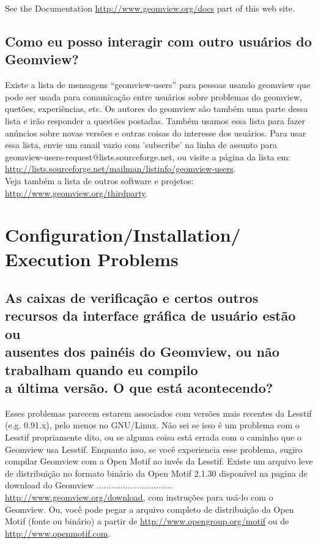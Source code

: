 \documentclass[12pt,a4paper]{article}
\begin{document}
        See the Documentation \url{http://www.geomview.org/docs} part of this web site.

    \subsection{Como eu posso interagir com outro usu\'arios do Geomview?}

        Existe a lista de mensagens ``geomview-users'' para pessoas usando geomview que
        pode ser usada para comunica\c{c}\~ao entre usu\'arios sobre problemas do geomview,
        quet\~oes, experi\^encias, etc. Os autores do geomview s\~ao tamb\'em uma parte dessa
        lista e ir\~ao responder a quest\~oes postadas. Tamb\'em usamos essa
        lista para fazer an\'uncios sobre novas vers\~oes e outras coisas do
        interesse dos usu\'arios. Para usar essa lista, envie um email vazio com 'subscribe'
        na linha de assunto para geomview-users-request@lists.sourceforge.net, ou visite a p\'agina
        da lista em:\\
        \url{http://lists.sourceforge.net/mailman/listinfo/geomview-users}.
	\\
        Veja tamb\'em a lista de outros software e projetos:\\
        \url{http://www.geomview.org/thirdparty}.

\section{Configuration/Installation/\\ Execution Problems}

    \subsection{As caixas de verifica\c{c}\~ao e certos outros recursos da interface gr\'afica de usu\'ario est\~ao ou \\
    ausentes dos pain\'eis do Geomview, ou n\~ao trabalham quando eu compilo \\
    a \'ultima vers\~ao. O que est\'a acontecendo?}

        Esses problemas parecem estarem associados com vers\~oes mais recentes da Lesstif
        (e.g. 0.91.x), pelo menos no GNU/Linux. N\~ao sei se isso \'e um problema
        com o Lesstif propriamente dito, ou se alguma coisa est\'a errada com o caminho que o Geomview usa
        Lesstif. Enquanto isso, se voc\^e experiencia esse problema, sugiro
        compilar Geomview com a Open Motif ao inv\'es da Lesstif. Existe um
        arquivo leve de distribui\c{c}\~ao no formato bin\'ario da Open Motif 2.1.30 dispon\'ivel na
        pagina de download do Geomview ................................\\ \url{http://www.geomview.org/download}, com
        instru\c{c}\~oes para us\'a-lo com o Geomview. Ou, voc\^e pode pegar a arquivo completo de distribui\c{c}\~ao da
        Open Motif (fonte ou bin\'ario) a partir de \url{http://www.opengroup.org/motif}
        ou de \url{http://www.openmotif.com}.
\end{document}
